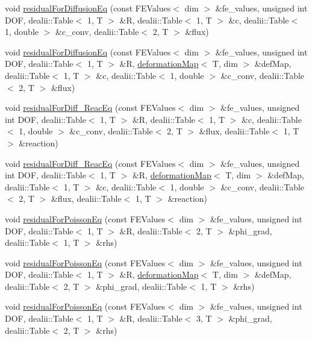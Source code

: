 \begin{DoxyCompactItemize}
\item 
void \mbox{\hyperlink{class_residual_a224462af849f5a1927bc90eb3795f2f2}{residual\+For\+Diffusion\+Eq}} (const F\+E\+Values$<$ dim $>$ \&fe\+\_\+values, unsigned int D\+OF, dealii\+::\+Table$<$ 1, T $>$ \&R, dealii\+::\+Table$<$ 1, T $>$ \&c, dealii\+::\+Table$<$ 1, double $>$ \&c\+\_\+conv, dealii\+::\+Table$<$ 2, T $>$ \&flux)
\item 
void \mbox{\hyperlink{class_residual_a69b8ab1cc85ae177f9c627b60b1b8468}{residual\+For\+Diffusion\+Eq}} (const F\+E\+Values$<$ dim $>$ \&fe\+\_\+values, unsigned int D\+OF, dealii\+::\+Table$<$ 1, T $>$ \&R, \mbox{\hyperlink{structdeformation_map}{deformation\+Map}}$<$ T, dim $>$ \&def\+Map, dealii\+::\+Table$<$ 1, T $>$ \&c, dealii\+::\+Table$<$ 1, double $>$ \&c\+\_\+conv, dealii\+::\+Table$<$ 2, T $>$ \&flux)
\item 
void \mbox{\hyperlink{class_residual_a144663fb81fc60d4db0c5a8e45176e61}{residual\+For\+Diff\+\_\+\+Reac\+Eq}} (const F\+E\+Values$<$ dim $>$ \&fe\+\_\+values, unsigned int D\+OF, dealii\+::\+Table$<$ 1, T $>$ \&R, dealii\+::\+Table$<$ 1, T $>$ \&c, dealii\+::\+Table$<$ 1, double $>$ \&c\+\_\+conv, dealii\+::\+Table$<$ 2, T $>$ \&flux, dealii\+::\+Table$<$ 1, T $>$ \&reaction)
\item 
void \mbox{\hyperlink{class_residual_aa88dcdddfeefb2ba5f1f1196d8608b70}{residual\+For\+Diff\+\_\+\+Reac\+Eq}} (const F\+E\+Values$<$ dim $>$ \&fe\+\_\+values, unsigned int D\+OF, dealii\+::\+Table$<$ 1, T $>$ \&R, \mbox{\hyperlink{structdeformation_map}{deformation\+Map}}$<$ T, dim $>$ \&def\+Map, dealii\+::\+Table$<$ 1, T $>$ \&c, dealii\+::\+Table$<$ 1, double $>$ \&c\+\_\+conv, dealii\+::\+Table$<$ 2, T $>$ \&flux, dealii\+::\+Table$<$ 1, T $>$ \&reaction)
\item 
void \mbox{\hyperlink{class_residual_af1d58eecf6eeae74de2f7ebc6a158b18}{residual\+For\+Poisson\+Eq}} (const F\+E\+Values$<$ dim $>$ \&fe\+\_\+values, unsigned int D\+OF, dealii\+::\+Table$<$ 1, T $>$ \&R, dealii\+::\+Table$<$ 2, T $>$ \&phi\+\_\+grad, dealii\+::\+Table$<$ 1, T $>$ \&rhs)
\item 
void \mbox{\hyperlink{class_residual_ad457db9bcfe7ff4d134642440cd1c4e6}{residual\+For\+Poisson\+Eq}} (const F\+E\+Values$<$ dim $>$ \&fe\+\_\+values, unsigned int D\+OF, dealii\+::\+Table$<$ 1, T $>$ \&R, \mbox{\hyperlink{structdeformation_map}{deformation\+Map}}$<$ T, dim $>$ \&def\+Map, dealii\+::\+Table$<$ 2, T $>$ \&phi\+\_\+grad, dealii\+::\+Table$<$ 1, T $>$ \&rhs)
\item 
void \mbox{\hyperlink{class_residual_ad1d5fc375c6f93d9aad89fc1cf9fd25f}{residual\+For\+Poisson\+Eq}} (const F\+E\+Values$<$ dim $>$ \&fe\+\_\+values, unsigned int D\+OF, dealii\+::\+Table$<$ 1, T $>$ \&R, dealii\+::\+Table$<$ 3, T $>$ \&phi\+\_\+grad, dealii\+::\+Table$<$ 2, T $>$ \&rhs)

\end{DoxyCompactItemize}
